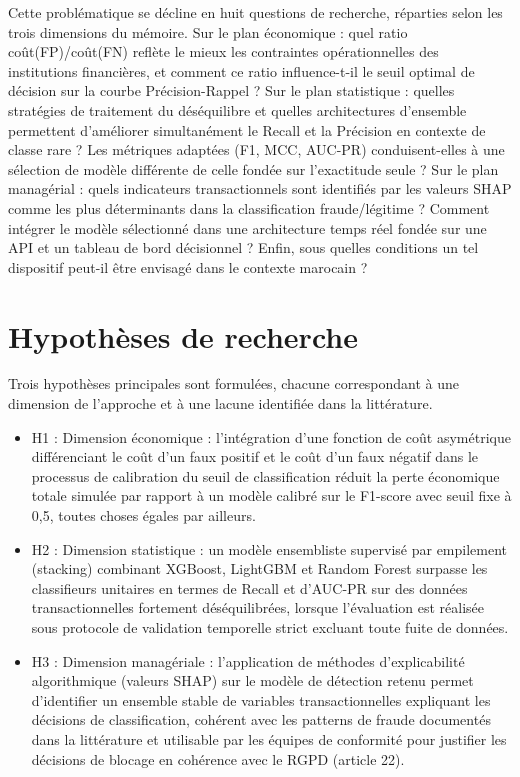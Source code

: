 Cette problématique se décline en huit questions de recherche, réparties selon les trois dimensions du mémoire. Sur le plan économique : quel ratio coût(FP)/coût(FN) reflète le mieux les contraintes opérationnelles des institutions financières, et comment ce ratio influence-t-il le seuil optimal de décision sur la courbe Précision-Rappel ? Sur le plan statistique : quelles stratégies de traitement du déséquilibre et quelles architectures d'ensemble permettent d'améliorer simultanément le Recall et la Précision en contexte de classe rare ? Les métriques adaptées (F1, MCC, AUC-PR) conduisent-elles à une sélection de modèle différente de celle fondée sur l'exactitude seule ? Sur le plan managérial : quels indicateurs transactionnels sont identifiés par les valeurs SHAP comme les plus déterminants dans la classification fraude/légitime ? Comment intégrer le modèle sélectionné dans une architecture temps réel fondée sur une API et un tableau de bord décisionnel ? Enfin, sous quelles conditions un tel dispositif peut-il être envisagé dans le contexte marocain ?

\section*{Hypothèses de recherche}

Trois hypothèses principales sont formulées, chacune correspondant à une dimension de l'approche et à une lacune identifiée dans la littérature.

\begin{itemize}
\item H1 : Dimension économique : l'intégration d'une fonction de coût asymétrique différenciant le coût d'un faux positif et le coût d'un faux négatif dans le processus de calibration du seuil de classification réduit la perte économique totale simulée par rapport à un modèle calibré sur le F1-score avec seuil fixe à 0,5, toutes choses égales par ailleurs.
\item H2 : Dimension statistique : un modèle ensembliste supervisé par empilement (stacking) combinant XGBoost, LightGBM et Random Forest surpasse les classifieurs unitaires en termes de Recall et d'AUC-PR sur des données transactionnelles fortement déséquilibrées, lorsque l'évaluation est réalisée sous protocole de validation temporelle strict excluant toute fuite de données.
\item H3 : Dimension managériale : l'application de méthodes d'explicabilité algorithmique (valeurs SHAP) sur le modèle de détection retenu permet d'identifier un ensemble stable de variables transactionnelles expliquant les décisions de classification, cohérent avec les patterns de fraude documentés dans la littérature et utilisable par les équipes de conformité pour justifier les décisions de blocage en cohérence avec le RGPD (article 22).
\end{itemize}

